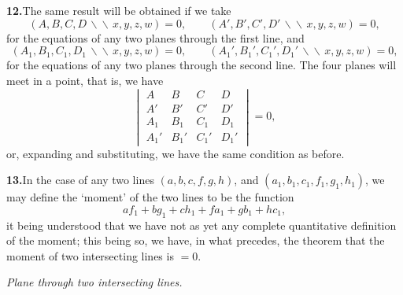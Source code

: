 \documentclass[11pt,a4paper]{article}
\begin{document}
\textbf{12.}\quad The same result will be obtained if we take
\[
(A, B, C, D \,\backslash\!\!\backslash\, x, y, z, w) = 0, \qquad
(A', B', C', D' \,\backslash\!\!\backslash\, x, y, z, w) = 0,
\]
for the equations of any two planes through the first line, and
\[
(A_{1}, B_{1}, C_{1}, D_{1} \,\backslash\!\!\backslash\, x, y, z, w) = 0, \qquad
(A_{1}', B_{1}', C_{1}', D_{1}' \,\backslash\!\!\backslash\, x, y, z, w) = 0,
\]
for the equations of any two planes through the second line. The four planes
will meet in a point, that is, we have
\[
\begin{vmatrix}
A & B & C & D \\
A' & B' & C' & D' \\
A_{1} & B_{1} & C_{1} & D_{1} \\
A_{1}' & B_{1}' & C_{1}' & D_{1}'
\end{vmatrix} = 0,
\]
or, expanding and substituting, we have the same condition as before.

\textbf{13.}\quad In the case of any two lines $(a, b, c, f, g, h)$, and
$(a_{1}, b_{1}, c_{1}, f_{1}, g_{1}, h_{1})$, we may define the `moment' of
the two lines to be the function
\[
a f_{1} + b g_{1} + c h_{1} + f a_{1} + g b_{1} + h c_{1},
\]
it being understood that we have not as yet any complete quantitative
definition of the moment; this being so, we have, in what precedes, the
theorem that the moment of two intersecting lines is $= 0$.

\medskip
\noindent\textit{Plane through two intersecting lines.}
\medskip
\end{document}
